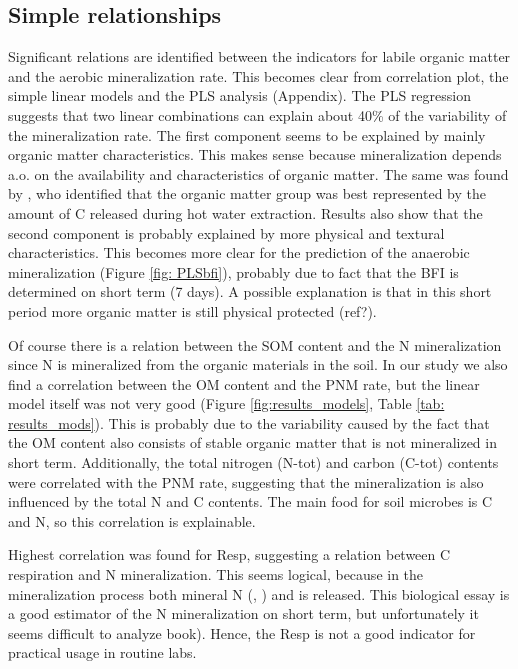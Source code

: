 \documentclass[10pt,twoside,dutch,english]{report}
\begin{document}
\subsection{Simple relationships  }
Significant relations are identified between the indicators for labile organic matter and the aerobic mineralization rate. This becomes clear from correlation plot, the simple linear models and the PLS analysis (Appendix). The PLS regression suggests that two linear combinations can explain about 40\% of the variability of the mineralization rate. The first component seems to be explained by mainly organic matter characteristics. This makes sense because mineralization depends a.o. on the availability and characteristics of organic matter. The same was found by \citep{ros}, who identified that the organic matter group was best represented by the amount of C released during hot water extraction. Results also show that the second component is probably explained by more physical and textural characteristics. This becomes more clear for the prediction of the anaerobic mineralization (Figure \ref{fig: PLSbfi}), probably due to fact that the BFI is determined on short term (7 days). A possible explanation is that in this short period more organic matter is still physical protected (ref?).

Of course there is a relation between the SOM content and the N mineralization since N is mineralized from the organic materials in the soil. In our study we also find a correlation between the OM content and the PNM rate, but the linear model itself was not very good (Figure \ref{fig:results_models}, Table \ref{tab: results_mods}). This is probably due to the variability caused by the fact that the OM content also consists of stable organic matter that is not mineralized in short term.  Additionally, the total nitrogen (N-tot) and carbon (C-tot) contents were correlated with the PNM rate, suggesting that the mineralization is also influenced by the total N and C contents. The main food for soil microbes is C and N, so this correlation is explainable.   

Highest correlation was found for Resp, suggesting a relation between C respiration and N mineralization. This seems logical, because in the mineralization process both mineral N (, ) and  is released.  This biological essay is a good estimator of the N mineralization on short term, but unfortunately it seems difficult to analyze \citep{Bloem2005} book). Hence, the Resp is not a good indicator for practical usage in routine labs.  
\end{document}
